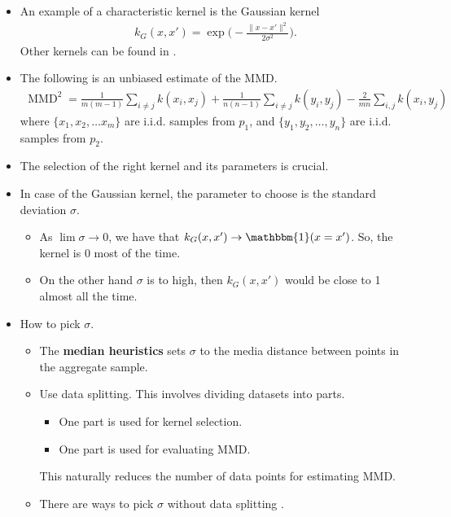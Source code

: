 \documentclass[10pt]{article}
\newcommand{\ra}{\rightarrow}
\begin{document}
\begin{itemize}
    \item An example of a characteristic kernel is the Gaussian kernel
    \begin{align*}
        k_G(x,x') = \exp\bigg( - \frac{\| x - x' \|^2}{2\sigma^2} \bigg).
    \end{align*}
    Other kernels can be found in \cite{Fukumizu:2009}.

    \item The following is an unbiased estimate of the MMD.
    \begin{align*}
        \operatorname{MMD}^2 = \frac{1}{m(m-1)} \sum_{i\neq j} k(x_i, x_j) + \frac{1}{n(n-1)} \sum_{i\neq j} k(y_i, y_j) - \frac{2}{mn}\sum_{i,j} k(x_i,y_j)
    \end{align*}
    where $\{ x_1, x_2, \dotsc x_m \}$ are i.i.d. samples from $p_1$, and $\{ y_1, y_2, \dotsc, y_n \}$ are i.i.d. samples from $p_2$.

    \item The selection of the right kernel and its parameters is crucial.
    
    \item In case of the Gaussian kernel, the parameter to choose is the standard deviation $\sigma$.
    \begin{itemize}
        \item As $\lim \sigma \ra 0$, we have that $k_G(x,x') \ra \mathbbm{1}(x = x')$. So, the kernel is 0 most of the time.
        \item On the other hand $\sigma$ is to high, then $k_G(x,x')$ would be close to 1 almost all the time.
    \end{itemize}

    \item How to pick $\sigma$.
    \begin{itemize}
        \item The {\bf median heuristics} sets $\sigma$ to the media distance between points in the aggregate sample.
        
        \item Use data splitting. This involves dividing datasets into parts.
        \begin{itemize}
            \item One part is used for kernel selection.
            \item One part is used for evaluating MMD.            
        \end{itemize}
        This naturally reduces the number of data points for estimating MMD.

        \item There are ways to pick $\sigma$ without data splitting \cite{Biggs:2023,Schrab:2023,Kubler:2022,Kubler:2023}.
    \end{itemize}
\end{itemize}
\end{document}
